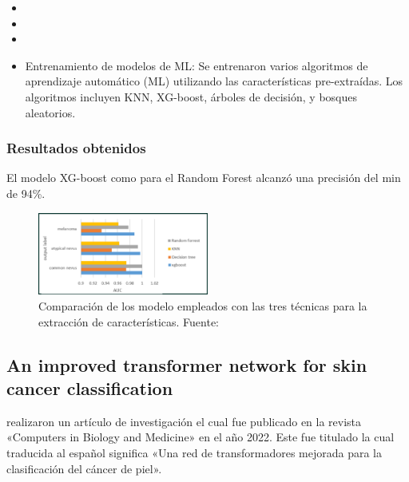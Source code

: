 \newcommand{\TPSCfour}{ Entrenamiento de modelos de ML: Se entrenaron varios algoritmos de aprendizaje automático (ML) utilizando las características pre-extraídas. Los algoritmos incluyen KNN, XG-boost, árboles de decisión, y bosques aleatorios.
}

\begin{itemize}
	\item \TPSCone
	\item \TPSCtwo
	\item \TPSCthree
	\item \TPSCfour
	
\end{itemize}



\subsubsection{Resultados obtenidos}
El modelo XG-boost como para el Random Forest alcanzó una precisión del min de 94\%. 


\begin{figure}[h]
	\begin{center}
		\includegraphics[width=0.5\textwidth]{2/figuras/Skin_cancer_classification_imagen_01.png}
		\caption{Comparación de los modelo empleados con las  tres técnicas para la extracción de características. Fuente: \cite{ali_2022multiclass}}
		\label{1:fig}
	\end{center}
\end{figure}





\subsection{An improved transformer network for skin cancer classification \citep*{xin2022improved}}
\citeauthor{xin2022improved} realizaron un artículo de investigación el cual fue publicado en la revista «Computers in Biology and Medicine» en el año 2022. Este fue titulado  la cual traducida al español significa «Una red de transformadores mejorada para la clasificación del cáncer de piel».


